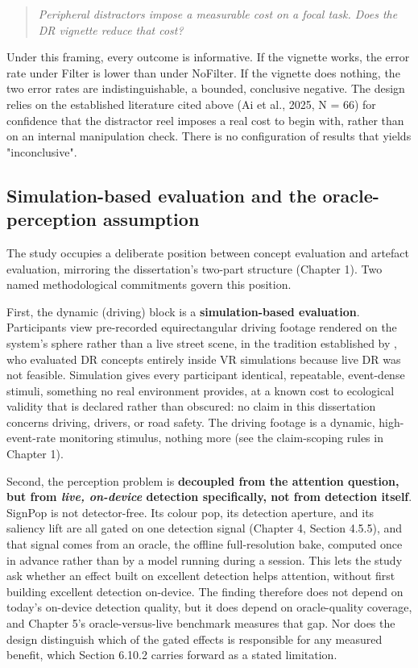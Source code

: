 \begin{quote}
\textit{Peripheral distractors impose a measurable cost on a focal task. Does the DR vignette reduce that
cost?}
\end{quote}

Under this framing, every outcome is informative. If the vignette works, the error rate under Filter
is lower than under NoFilter. If the vignette does nothing, the two error rates are indistinguishable,
a bounded, conclusive negative. The design relies on the established literature cited above (Ai et
al., 2025, N = 66) for confidence that the distractor reel imposes a real cost to begin with, rather
than on an internal manipulation check. There is no configuration of results that yields
"inconclusive".

\subsection{Simulation-based evaluation and the oracle-perception assumption}

The study occupies a deliberate position between concept evaluation and artefact evaluation, mirroring
the dissertation's two-part structure (Chapter 1). Two named methodological commitments govern this
position.

First, the dynamic (driving) block is a \textbf{simulation-based evaluation}. Participants view
pre-recorded equirectangular driving footage rendered on the system's sphere rather than a live street
scene, in the tradition established by \citet{cheng2022}, who evaluated DR concepts entirely inside
VR simulations because live DR was not feasible. Simulation gives every participant identical,
repeatable, event-dense stimuli, something no real environment provides, at a known cost to
ecological validity that is declared rather than obscured: no claim in this dissertation concerns
driving, drivers, or road safety. The driving footage is a dynamic, high-event-rate monitoring
stimulus, nothing more (see the claim-scoping rules in Chapter 1).

Second, the perception problem is \textbf{decoupled from the attention question, but from
\textit{live, on-device} detection specifically, not from detection itself}. SignPop is not
detector-free. Its colour pop, its detection aperture, and its saliency lift are all gated on one
detection signal (Chapter 4, Section 4.5.5), and that signal comes from an oracle, the offline
full-resolution bake, computed once in advance rather than by a model running during a session. This
lets the study ask whether an effect built on excellent detection helps attention, without first
building excellent detection on-device. The finding therefore does not depend on today's on-device
detection quality, but it does depend on oracle-quality coverage, and Chapter 5's oracle-versus-live
benchmark measures that gap. Nor does the design distinguish which of the gated effects is
responsible for any measured benefit, which Section 6.10.2 carries forward as a stated limitation.

